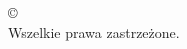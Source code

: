 \newpage
\thispagestyle{empty}
\null
\vfill
\begin{center}
    © \the\year\\
    Wszelkie prawa zastrzeżone.\\[1em]
    \begin{minipage}{0.5\textwidth}
    \EANisbn    
    \end{minipage}
\end{center}
